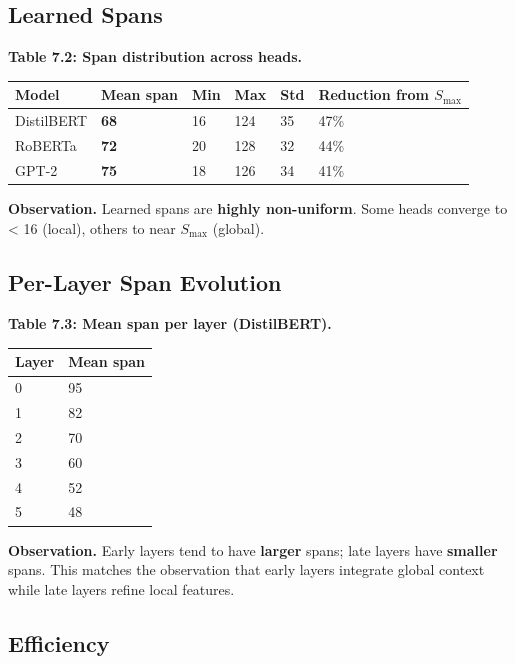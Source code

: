 \subsection{Learned Spans}

\textbf{Table 7.2: Span distribution across heads.}

\begin{table}[H]
\centering
\small
\begin{tabular}{llllll}
\toprule
\textbf{Model} & \textbf{Mean span} & \textbf{Min} & \textbf{Max} & \textbf{Std} & \textbf{Reduction from $S_\text{max}$} \\
\midrule
DistilBERT & \textbf{68} & 16 & 124 & 35 & 47\% \\
RoBERTa & \textbf{72} & 20 & 128 & 32 & 44\% \\
GPT-2 & \textbf{75} & 18 & 126 & 34 & 41\% \\
\bottomrule
\end{tabular}
\end{table}

\textbf{Observation.} Learned spans are \textbf{highly non-uniform}. Some heads 
converge to < 16 (local), others to near $S_\text{max}$ (global).

\subsection{Per-Layer Span Evolution}

\textbf{Table 7.3: Mean span per layer (DistilBERT).}

\begin{table}[H]
\centering
\small
\begin{tabular}{ll}
\toprule
\textbf{Layer} & \textbf{Mean span} \\
\midrule
0 & 95 \\
1 & 82 \\
2 & 70 \\
3 & 60 \\
4 & 52 \\
5 & 48 \\
\bottomrule
\end{tabular}
\end{table}

\textbf{Observation.} Early layers tend to have \textbf{larger} spans; late layers 
have \textbf{smaller} spans. This matches the observation that early layers 
integrate global context while late layers refine local features.

\subsection{Efficiency}

